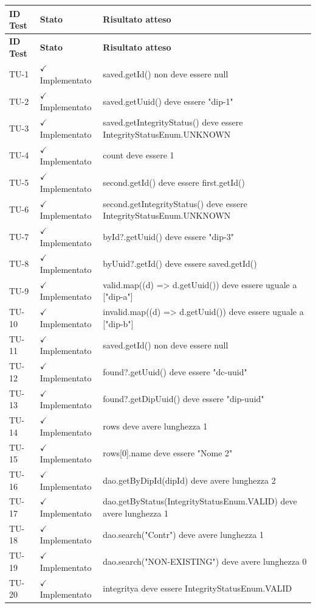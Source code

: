 ﻿\documentclass[a4paper,12pt]{article}
\newcommand{\ok}{\textcolor{green!60!black}{$\checkmark$ Implementato}}
\begin{document}
\setlength{\LTleft}{-0.4cm}
\renewcommand{\arraystretch}{1.2}
\begin{longtable}{|p{2cm}|p{3.5cm}|p{9.5cm}|}
\hline
\rowcolor{zpusgreen!30}
\textbf{ID Test} & \textbf{Stato} & \textbf{Risultato atteso} \\
\hline
\endfirsthead
\rowcolor{zpusgreen!30}
\textbf{ID Test} & \textbf{Stato} & \textbf{Risultato atteso} \\
\hline
\endhead
TU-1 & \ok & saved.getId() non deve essere null \\
\hline
TU-2 & \ok & saved.getUuid() deve essere "dip-1" \\
\hline
TU-3 & \ok & saved.getIntegrityStatus() deve essere IntegrityStatusEnum.UNKNOWN \\
\hline
TU-4 & \ok & count deve essere 1 \\
\hline
TU-5 & \ok & second.getId() deve essere first.getId() \\
\hline
TU-6 & \ok & second.getIntegrityStatus() deve essere IntegrityStatusEnum.UNKNOWN \\
\hline
TU-7 & \ok & byId?.getUuid() deve essere "dip-3" \\
\hline
TU-8 & \ok & byUuid?.getId() deve essere saved.getId() \\
\hline
TU-9 & \ok & valid.map((d) => d.getUuid()) deve essere uguale a ["dip-a"] \\
\hline
TU-10 & \ok & invalid.map((d) => d.getUuid()) deve essere uguale a ["dip-b"] \\
\hline
TU-11 & \ok & saved.getId() non deve essere null \\
\hline
TU-12 & \ok & found?.getUuid() deve essere "dc-uuid" \\
\hline
TU-13 & \ok & found?.getDipUuid() deve essere "dip-uuid" \\
\hline
TU-14 & \ok & rows deve avere lunghezza 1 \\
\hline
TU-15 & \ok & rows[0].name deve essere "Nome 2" \\
\hline
TU-16 & \ok & dao.getByDipId(dipId) deve avere lunghezza 2 \\
\hline
TU-17 & \ok & dao.getByStatus(IntegrityStatusEnum.VALID) deve avere lunghezza 1 \\
\hline
TU-18 & \ok & dao.search("Contr") deve avere lunghezza 1 \\
\hline
TU-19 & \ok & dao.search("NON-EXISTING") deve avere lunghezza 0 \\
\hline
TU-20 & \ok & integritya deve essere IntegrityStatusEnum.VALID \\

\end{longtable}
\end{document}
